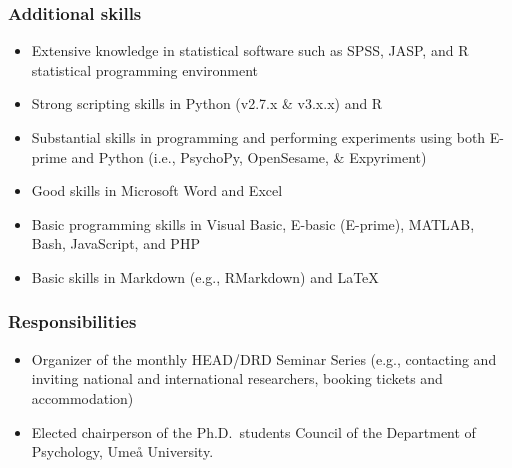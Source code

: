 \documentclass[]{article}
\providecommand{\tightlist}{%
  \setlength{\itemsep}{0pt}\setlength{\parskip}{0pt}}
\begin{document}
\subsubsection{Additional skills}\label{additional-skills}

\begin{itemize}
\tightlist
\item
  Extensive knowledge in statistical software such as SPSS, JASP, and R
  statistical programming environment
\item
  Strong scripting skills in Python (v2.7.x \& v3.x.x) and R
\item
  Substantial skills in programming and performing experiments using
  both E-prime and Python (i.e., PsychoPy, OpenSesame, \& Expyriment)
\item
  Good skills in Microsoft Word and Excel
\item
  Basic programming skills in Visual Basic, E-basic (E-prime), MATLAB,
  Bash, JavaScript, and PHP
\item
  Basic skills in Markdown (e.g., RMarkdown) and \LaTeX
\end{itemize}

\subsubsection{Responsibilities}\label{responsibilities}

\begin{itemize}
\tightlist
\item
  Organizer of the monthly HEAD/DRD Seminar Series (e.g., contacting and
  inviting national and international researchers, booking tickets and
  accommodation)
\item
  Elected chairperson of the Ph.D.~students Council of the Department of
  Psychology, Umeå University.
\end{itemize}

\newpage
\pagestyle{empty}
\end{document}
